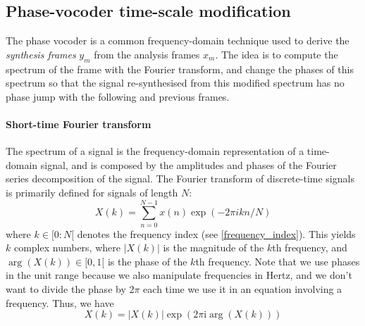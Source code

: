 \documentclass[letterpaper]{article}
\begin{document}
\subsection{Phase-vocoder time-scale modification}
The phase vocoder is a common frequency-domain technique used to derive the
\emph{synthesis frames} \(y_m\)  from the analysis frames \(x_m\). The idea
is to compute the spectrum of the frame with the Fourier transform, and change
the phases of this spectrum so that the signal re-synthesised from this modified
spectrum has no phase jump with the following and previous frames.
\paragraph{Short-time Fourier transform}
The spectrum of a signal is the frequency-domain representation of
a time-domain signal, and is composed by the amplitudes and phases of the
Fourier series decomposition of the signal. The Fourier transform of
discrete-time signals is primarily defined for signals of length \(N\):
\begin{equation}
	  X(k) = \sum_{n=0}^{N-1}x(n)\exp(-2\pi ikn/N)
\end{equation}
where \(k\in [0:N[\) denotes the frequency index (see \eqref{frequency_index}).
This yields \(k\) complex numbers, where \(|X(k)|\) is the magnitude of the
\(k\)th frequency, and \(\arg(X(k))\in[0,1[\) is the phase of the \(k\)th
frequency. Note that we use phases in the unit range because we also manipulate
frequencies in Hertz, and we don't want to divide the phase by \(2\pi\) each
time we use it in an equation
involving a frequency. Thus, we have
\begin{equation}
		X(k)= |X(k)|\exp(2\pi \text{i} \arg(X(k)))
\end{equation}
\end{document}
